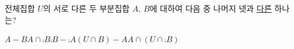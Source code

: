 전체집합 $U$의 서로 다른 두 부분집합 $A$, $B$에 대하여 다음 중 나머지 넷과 \underline{다른} 하나는?
\begin{choicesii}{$A-B$}{$A\cap\comp{B}$}{$\comp{B}-\comp{A}$}{$(U\cap B)-A$}{$A\cap(U\cap\comp{B})$}\end{choicesii}
